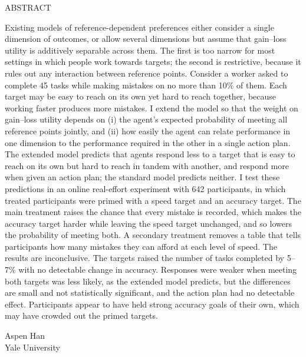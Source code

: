 \documentclass[12pt, letterpaper]{article}
\newcommand{\paperauthor}{Aspen Han}
\newcommand{\paperaffiliation}{Yale University}
\begin{document}
\bigskip

\begin{center}
ABSTRACT
\end{center}

Existing models of reference-dependent preferences either consider a single dimension of outcomes, or allow several dimensions but assume that gain--loss utility is additively separable across them. The first is too narrow for most settings in which people work towards targets; the second is restrictive, because it rules out any interaction between reference points. Consider a worker asked to complete 45 tasks while making mistakes on no more than 10\% of them. Each target may be easy to reach on its own yet hard to reach together, because working faster produces more mistakes. I extend the \textcite{koszegi.2006.modelreferencedependenta} model so that the weight on gain--loss utility depends on (i) the agent's expected probability of meeting all reference points jointly, and (ii) how easily the agent can relate performance in one dimension to the performance required in the other in a single action plan. The extended model predicts that agents respond less to a target that is easy to reach on its own but hard to reach in tandem with another, and respond more when given an action plan; the standard model predicts neither. I test these predictions in an online real-effort experiment with 642 participants, in which treated participants were primed with a speed target and an accuracy target. The main treatment raises the chance that every mistake is recorded, which makes the accuracy target harder while leaving the speed target unchanged, and so lowers the probability of meeting both. A secondary treatment removes a table that tells participants how many mistakes they can afford at each level of speed. The results are inconclusive. The targets raised the number of tasks completed by 5--7\% with no detectable change in accuracy. Responses were weaker when meeting both targets was less likely, as the extended model predicts, but the differences are small and not statistically significant, and the action plan had no detectable effect. Participants appear to have held strong accuracy goals of their own, which may have crowded out the primed targets.

\bigskip\bigskip

\noindent\paperauthor\\
\paperaffiliation

\newpage

\onehalfspacing
\end{document}
